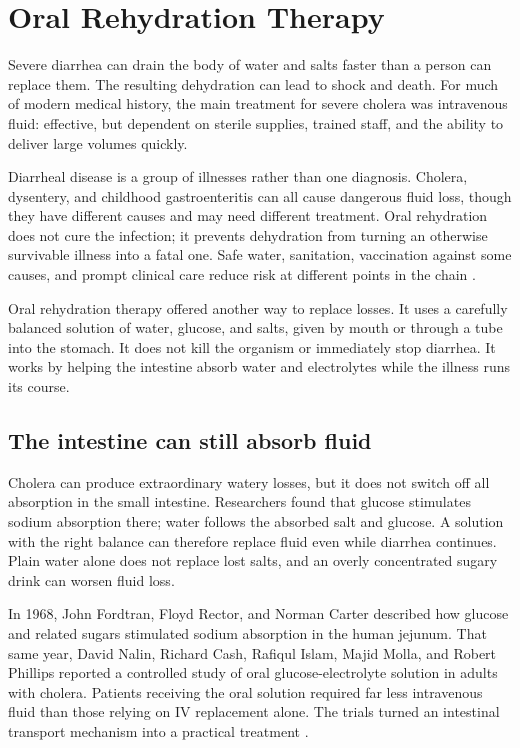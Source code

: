 \documentclass[12pt,oneside]{book}
\begin{document}
\chapter[Oral Rehydration Therapy]{Oral Rehydration Therapy}

Severe diarrhea can drain the body of water and salts faster than a person can
replace them. The resulting dehydration can lead to shock and death. For much
of modern medical history, the main treatment for severe cholera was
intravenous fluid: effective, but dependent on sterile supplies, trained
staff, and the ability to deliver large volumes quickly.

Diarrheal disease is a group of illnesses rather than one diagnosis. Cholera,
dysentery, and childhood gastroenteritis can all cause dangerous fluid loss,
though they have different causes and may need different treatment. Oral
rehydration does not cure the infection; it prevents dehydration from turning
an otherwise survivable illness into a fatal one. Safe water, sanitation,
vaccination against some causes, and prompt clinical care reduce risk at
different points in the chain \cite{whoDiarrhoea}.

Oral rehydration therapy offered another way to replace losses. It uses a
carefully balanced solution of water, glucose, and salts, given by mouth or
through a tube into the stomach. It does not kill the organism or immediately
stop diarrhea. It works by helping the intestine absorb water and electrolytes
while the illness runs its course.

\section{The intestine can still absorb fluid}
Cholera can produce extraordinary watery losses, but it does not switch off
all absorption in the small intestine. Researchers found that glucose
stimulates sodium absorption there; water follows the absorbed salt and
glucose. A solution with the right balance can therefore replace fluid even
while diarrhea continues. Plain water alone does not replace lost salts, and
an overly concentrated sugary drink can worsen fluid loss.

In 1968, John Fordtran, Floyd Rector, and Norman Carter described how glucose
and related sugars stimulated sodium absorption in the human jejunum. That
same year, David Nalin, Richard Cash, Rafiqul Islam, Majid Molla, and Robert
Phillips reported a controlled study of oral glucose-electrolyte solution in
adults with cholera. Patients receiving the oral solution required far less
intravenous fluid than those relying on IV replacement alone. The trials
turned an intestinal transport mechanism into a practical treatment
\cite{fordtran1968,nalin1968}.
\end{document}
